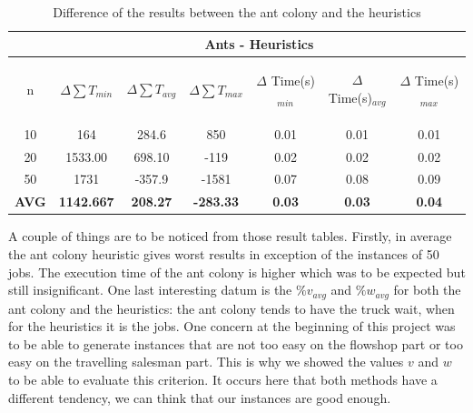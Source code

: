 \documentclass[UTF8, twoside]{EPURapport}
\begin{document}
\begin{table}[!h]
\centering
\setlength{\extrarowheight}{1.5pt}
\begin{tabular}{|c|c|c|c|c|c|c|} 
\hline
 & \multicolumn{6}{c|}{Ants - Heuristics} \\
\hline
n & $\Delta \sum T_{min}$ & $\Delta \sum T_{avg}$ & $\Delta \sum T_{max}$ & \begin{sideways}$\Delta$ Time(s)$_{min}$ \end{sideways} & \begin{sideways}$\Delta$ Time(s)$_{avg}$ \end{sideways} & \begin{sideways}$\Delta$ Time(s)$_{max}$ \end{sideways}\\
\hline
10 & \cellcolor{red}164 & \cellcolor{red}284.6 & \cellcolor{red}850 & \cellcolor{red}0.01 & \cellcolor{red}0.01 & \cellcolor{red}0.01\\
\hline
20 & \cellcolor{red}1533.00 & \cellcolor{red}698.10 & \cellcolor{green}-119 & \cellcolor{red}0.02 & \cellcolor{red}0.02 & \cellcolor{red}0.02\\
\hline
50 & \cellcolor{red}1731 & \cellcolor{green}-357.9 & \cellcolor{green}-1581 & \cellcolor{red}0.07 & \cellcolor{red}0.08 & \cellcolor{red}0.09\\
\hline
\textbf{AVG} & \cellcolor{red}\textbf{1142.667} & \cellcolor{red}\textbf{208.27} & \cellcolor{green}\textbf{-283.33} & \cellcolor{red}\textbf{0.03} & \cellcolor{red}\textbf{0.03} & \cellcolor{red}\textbf{0.04}\\
\hline
\end{tabular}
\caption{\label{tab:diff}Difference of the results between the ant colony and the heuristics}
\end{table}

\clearpage

	A couple of things are to be noticed from those result tables. Firstly, in average the ant colony heuristic gives worst results in exception of the instances of 50 jobs. The execution time of the ant colony is higher which was to be expected but still insignificant. One last interesting datum is the $\%v_{avg}$ and $\%w_{avg}$ for both the ant colony and the heuristics: the ant colony tends to have the truck wait, when for the heuristics it is the jobs. One concern at the beginning of this project was to be able to generate instances that are not too easy on the flowshop part or too easy on the travelling salesman part. This is why we showed the values $v$ and $w$ to be able to evaluate this criterion. It occurs here that both methods have a different tendency, we can think that our instances are good enough.
\end{document}
